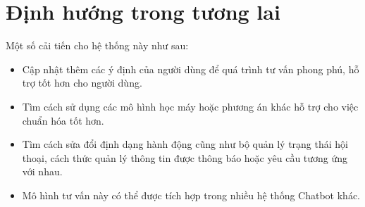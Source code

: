 \section{Định hướng trong tương lai}
Một số cải tiến cho hệ thống này như sau:

\begin{itemize}
    \item Cập nhật thêm các ý định của người dùng để quá trình tư vấn phong phú, hỗ trợ tốt hơn cho người dùng.
    \item Tìm cách sử dụng các mô hình học máy hoặc phương án khác hỗ trợ cho việc chuẩn hóa tốt hơn.
    \item Tìm cách sửa đổi định dạng hành động cũng như bộ quản lý trạng thái hội thoại, cách thức quản lý thông tin được thông báo hoặc yêu cầu tương ứng với nhau.
    \item Mô hình tư vấn này có thể được tích hợp trong nhiều hệ thống Chatbot khác.
\end{itemize}
